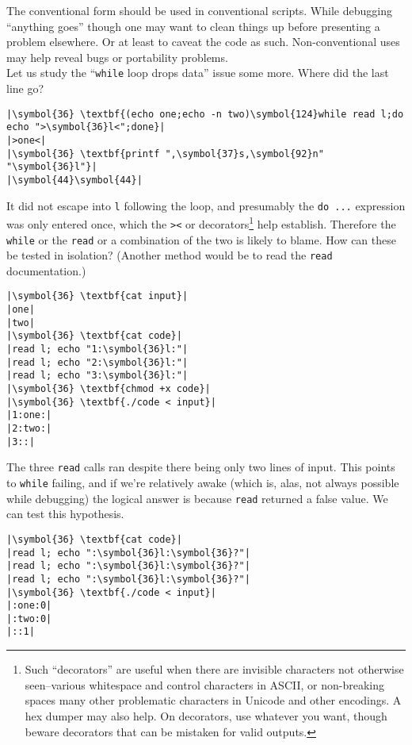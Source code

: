 \documentclass[10pt,a4paper]{article}
\begin{document}
The conventional form should be used in conventional scripts. While
debugging ``anything goes'' though one may want to clean things up
before presenting a problem elsewhere. Or at least to caveat the
code as such. Non-conventional uses may help reveal bugs or
portability problems. \\

Let us study the ``\texttt{while} loop drops data'' issue some more.
Where did the last line go?

\begin{lstlisting}
|\symbol{36} \textbf{(echo one;echo -n two)\symbol{124}while read l;do echo ">\symbol{36}l<";done}|
|>one<|
|\symbol{36} \textbf{printf ",\symbol{37}s,\symbol{92}n" "\symbol{36}l"}|
|\symbol{44}\symbol{44}|
\end{lstlisting}

It did not escape into \texttt{l} following the loop, and
presumably the \texttt{do ...} expression was only entered once, which
the \texttt{><} or \texttt{}
decorators\footnote{Such ``decorators'' are useful when there are
invisible characters not otherwise seen--various whitespace and control
characters in ASCII, or non-breaking spaces many other problematic
characters in Unicode and other encodings. A hex dumper may also help.
On decorators, use whatever you want, though beware decorators that can
be mistaken for valid outputs.} help establish. Therefore the
\texttt{while} or the \texttt{read} or a combination of the two is
likely to blame. How can these be tested in isolation? (Another method
would be to read the \texttt{read} documentation.)

\begin{lstlisting}
|\symbol{36} \textbf{cat input}|
|one|
|two|
|\symbol{36} \textbf{cat code}|
|read l; echo "1:\symbol{36}l:"|
|read l; echo "2:\symbol{36}l:"|
|read l; echo "3:\symbol{36}l:"|
|\symbol{36} \textbf{chmod +x code}|
|\symbol{36} \textbf{./code < input}|
|1:one:|
|2:two:|
|3::|
\end{lstlisting}

The three \texttt{read} calls ran despite there being only two lines
of input. This points to \texttt{while} failing, and if we're
relatively awake (which is, alas, not always possible while debugging)
the logical answer is because \texttt{read} returned a false value. We
can test this hypothesis.

\begin{lstlisting}
|\symbol{36} \textbf{cat code}|
|read l; echo ":\symbol{36}l:\symbol{36}?"|
|read l; echo ":\symbol{36}l:\symbol{36}?"|
|read l; echo ":\symbol{36}l:\symbol{36}?"|
|\symbol{36} \textbf{./code < input}|
|:one:0|
|:two:0|
|::1|
\end{lstlisting}
\end{document}
